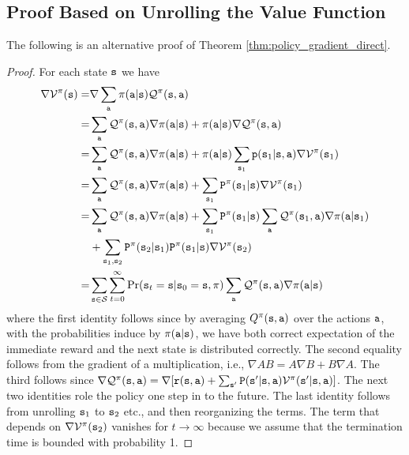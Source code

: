 \subsection{Proof Based on Unrolling the Value Function}
The following is an alternative proof of Theorem \ref{thm:policy_gradient_direct}.
\begin{proof}
For each state ${\tt s}$ we have
\begin{align*}
\nabla \mathcal{V}^\pi({\tt s}) =& \nabla \sum_{\tt a} \pi({\tt a}|{\tt s}) \mathcal{Q}^\pi({\tt s},{\tt a})\\
=&\sum_{\tt a}  \mathcal{Q}^\pi({\tt s},{\tt a}) \nabla \pi({\tt a}|{\tt s}) + \pi({\tt a}|{\tt s}) \nabla \mathcal{Q}^\pi({\tt s},{\tt a})\\
=&\sum_{\tt a}  \mathcal{Q}^\pi({\tt s},{\tt a}) \nabla \pi({\tt a}|{\tt s}) + \pi({\tt a}|{\tt s}) \sum_{{\tt s}_1} {\tt p}({\tt s}_1|{\tt s},{\tt a}) \nabla \mathcal{V}^\pi({\tt s}_1)\\
=& \sum_{\tt a}  \mathcal{Q}^\pi({\tt s},{\tt a}) \nabla
\pi({\tt a}|{\tt s}) + \sum_{{\tt s}_1} {\tt P}^{\pi}({\tt s}_1|{\tt s})
\nabla \mathcal{V}^\pi({\tt s}_1)\\
=& \sum_{\tt a}  \mathcal{Q}^\pi({\tt s},{\tt a}) \nabla
\pi({\tt a}|{\tt s}) + \sum_{{\tt s}_1} {\tt P}^{\pi}({\tt s}_1|{\tt s})
\sum_{\tt a} \mathcal{Q}^\pi({\tt s}_1,{\tt a}) \nabla
\pi({\tt a}|{\tt s}_1) \\
& + \sum_{{\tt s}_1, {\tt s}_2}
{\tt P}^{\pi}({\tt s}_2|{\tt s}_1){\tt P}^{\pi}({\tt s}_1|{\tt s})
\nabla \mathcal{V}^\pi({\tt s}_2)\\
=& \sum_{{\tt s}\in
\mathcal{S}}\sum_{t=0}^\infty \Pr({\tt s}_t = {\tt s} | {\tt s}_0 = {\tt s}, \pi) \sum_{\tt a}
\mathcal{Q}^\pi({\tt s},{\tt a})\nabla\pi({\tt a}|{\tt s})
\end{align*}
where the first identity follows since by averaging $Q^\pi({\tt s},{\tt a})$ over the actions ${\tt a}$, with the
probabilities induce by $\pi({\tt a}|{\tt s})$, we have both correct expectation of the immediate reward and the next state is distributed correctly. The second equality follows from the gradient of a multiplication, i.e., $\nabla AB=A\nabla B+B\nabla A$. The third follows since 
$\nabla \mathcal{Q}^\pi({\tt s},{\tt a})= \nabla
[{\tt r}({\tt s},{\tt a})+
\sum_{{\tt s}'}{\tt P}({\tt s}'|{\tt s},{\tt a})\mathcal{V}^\pi({\tt s}'|{\tt s},{\tt a})]$.
%
The next two identities role the policy one step in to the future.
%
The last identity follows from unrolling ${\tt s}_1$ to ${\tt s}_2$ etc., and then reorganizing the terms. The term that depends on $\nabla \mathcal{V}^\pi({\tt s}_2)$ vanishes for $t\to\infty$ because we assume that the termination time is bounded with probability 1.


\end{proof}
